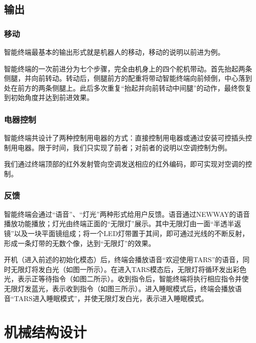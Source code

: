     \subsection{输出}
    \subsubsection{移动}
    \hspace{1.5em}智能终端最基本的输出形式就是机器人的移动，移动的说明以前进为例。
    
    \hspace{1.5em}智能终端的一次前进分为七个步骤，完全由机身上的四个舵机带动。首先抬起两条侧腿，并向前转动。转动后，侧腿前方的配重将带动智能终端向前倾倒，中心落到处在前方的两条侧腿上。此后多次重复“抬起并向前转动中间腿”的动作，最终恢复到初始角度并达到前进效果。

    \subsubsection{电器控制}
    \hspace{1.5em}智能终端共设计了两种控制用电器的方式：直接控制用电器或通过安装可控插头控制用电器。限于时间，我们只实现了前者；对前者的说明以空调控制为例。

    \hspace{1.5em}我们通过终端顶部的红外发射管向空调发送相应的红外编码，即可实现对空调的控制。

    \subsubsection{反馈}
    \hspace{1.5em}智能终端会通过“语音”、“灯光”两种形式给用户反馈。语音通过NEWWAY的语音播放功能播放；灯光由终端正面的“无限灯”展示。其中无限灯由一面“半透半返镜”以及一块平面镜组成；将一个LED灯带置于其间，即可通过光线的不断反射，形成一条灯带的无数个像，达到“无限灯”的效果。
    
    \hspace{1.5em}开机（进入前述的初始化模态）后，终端会播放语音“欢迎使用TARS”的语音，同时无限灯将发白光（如图一所示）。在进入TARS模态后，无限灯将循环发出彩色光，表示正等待指令（如图二所示）。收到指令后，智能终端将执行相应指令并使无限灯发蓝光，表示收到指令（如图三所示）。进入睡眠模式后，终端会播放语音“TARS进入睡眠模式”，并使无限灯发白光，表示进入睡眠模式。

\section{机械结构设计}


